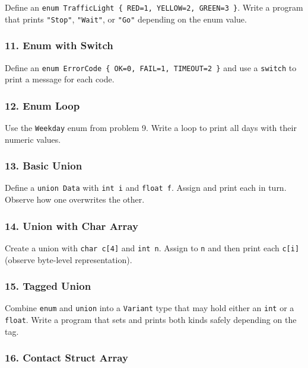 \documentclass[
  letterpaper,
  DIV=11,
  numbers=noendperiod]{scrreprt}
\begin{document}
Define an
\texttt{enum\ TrafficLight\ \{\ RED=1,\ YELLOW=2,\ GREEN=3\ \}}. Write a
program that prints \texttt{"Stop"}, \texttt{"Wait"}, or \texttt{"Go"}
depending on the enum value.

\subsubsection{11. Enum with Switch}\label{enum-with-switch}

Define an \texttt{enum\ ErrorCode\ \{\ OK=0,\ FAIL=1,\ TIMEOUT=2\ \}}
and use a \texttt{switch} to print a message for each code.

\subsubsection{12. Enum Loop}\label{enum-loop}

Use the \texttt{Weekday} enum from problem 9. Write a loop to print all
days with their numeric values.

\subsubsection{13. Basic Union}\label{basic-union}

Define a \texttt{union\ Data} with \texttt{int\ i} and
\texttt{float\ f}. Assign and print each in turn. Observe how one
overwrites the other.

\subsubsection{14. Union with Char Array}\label{union-with-char-array}

Create a union with \texttt{char\ c{[}4{]}} and \texttt{int\ n}. Assign
to \texttt{n} and then print each \texttt{c{[}i{]}} (observe byte-level
representation).

\subsubsection{15. Tagged Union}\label{tagged-union}

Combine \texttt{enum} and \texttt{union} into a \texttt{Variant} type
that may hold either an \texttt{int} or a \texttt{float}. Write a
program that sets and prints both kinds safely depending on the tag.

\subsubsection{16. Contact Struct Array}\label{contact-struct-array}
\end{document}
